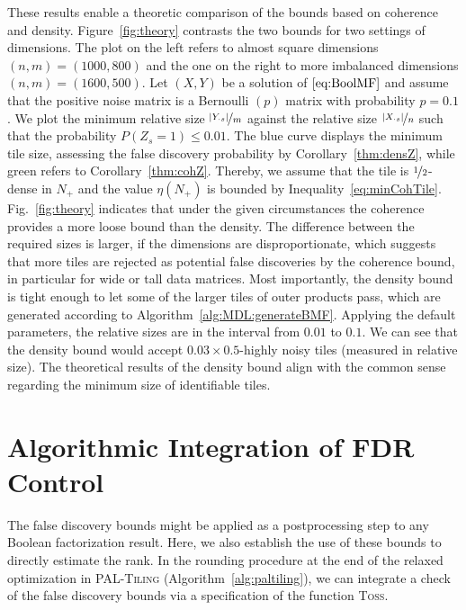 These results enable a theoretic comparison of the bounds based on coherence and density. Figure~\ref{fig:theory} contrasts the two bounds for two settings of dimensions. The plot on the left refers to almost square dimensions $(n,m)=(1000,800)$ and the one on the right to more imbalanced dimensions $(n,m)=(1600,500)$. Let $(X,Y)$ be a solution of $\eqref{eq:BoolMF}$ and assume that the positive noise matrix is a Bernoulli $(p)$ matrix with probability $p=0.1$. We plot the minimum relative size $\nicefrac{|Y_{\cdot s}|}{m}$ against the relative size $\nicefrac{|X_{\cdot s}|}{n}$ such that the probability $P(Z_s=1)\leq 0.01$. The blue curve displays the minimum tile size, assessing the false discovery probability by Corollary~\ref{thm:densZ}, while green refers to Corollary~\ref{thm:cohZ}. Thereby, we assume that the tile is $\nicefrac{1}{2}$-dense in $N_+$ and the value $\eta(N_+)$ is bounded by Inequality~\eqref{eq:minCohTile}. Fig.~\ref{fig:theory} indicates that under the given circumstances the coherence provides a more loose bound than the density. The difference between the required sizes is larger, if the dimensions are disproportionate, which suggests that more tiles are rejected as potential false discoveries by the coherence bound, in particular for wide or tall data matrices. Most importantly, the density bound is tight enough to let some of the larger tiles of outer products pass, which are generated according to Algorithm~\ref{alg:MDL:generateBMF}. Applying the default parameters, the relative sizes are in the interval from $0.01$ to $0.1$. We can see that the density bound would accept $0.03\times 0.5$-highly noisy tiles (measured in relative size). The theoretical results of the density bound align with the common sense regarding the minimum size of identifiable tiles.   
\section{Algorithmic Integration of FDR Control}\label{sec:TP:algorithmicIntegration}
The false discovery bounds might be applied as a postprocessing step to any Boolean factorization result. Here, we also establish the use of these bounds to directly estimate the rank.
In the rounding procedure at the end of the relaxed optimization in \textsc{PAL-Tiling} (Algorithm~\ref{alg:paltiling}), we can integrate a check of the false discovery bounds via a specification of the function \textsc{Toss}.
 
